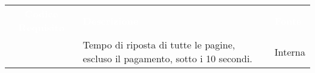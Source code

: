 \renewcommand{\arraystretch}{1.5}



\begin{longtable}{|c C{9.5cm} C{2.5cm}|} 
	
	\textcolor{white}{\textbf{Codice Requisito}}&
	\textcolor{white}{\textbf{Descrizione}}&
	\textcolor{white}{\textbf{Fonte}}\\

	 & Tempo di riposta di tutte le pagine, escluso il pagamento, sotto i 10 secondi. & Interna \\

\end{longtable}
